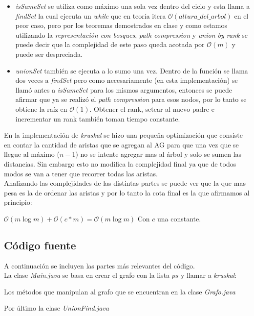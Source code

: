\begin{itemize}
	\item \textit{isSameSet} se utiliza como máximo una sola vez dentro del ciclo y esta llama a \textit{findSet} la cual ejecuta un \emph{while} que en teoría itera $\mathcal{O}(altura\_del\_arbol)$ en el peor caso, pero por los teoremas demostrados en clase y como estamos utilizando la \emph{representación con bosques}, \emph{path compression} y \emph{union by rank} se puede decir que la complejidad de este paso queda acotada por $\mathcal{O}(m)$ y puede ser despreciada.
	\item \textit{unionSet} también se ejecuta a lo sumo una vez. Dentro de la función se llama dos veces a \textit{findSet} pero como necesariamente (en esta implementación) se llamó antes a \textit{isSameSet} para los mismos argumentos, entonces se puede afirmar que ya se realizó el \emph{path compression} para esos nodos, por lo tanto se obtiene la raíz en $\mathcal{O}(1)$. Obtener el rank, setear al nuevo padre e incrementar un rank también toman tiempo constante.  
\end{itemize}

En la implementación de \textit{kruskal} se hizo una pequeña optimización que consiste en contar la cantidad de aristas que se agregan al AG para que una vez que se llegue al máximo ($n-1$) no se intente agregar mas al árbol y solo se sumen las distancias. Sin embargo esto no modifica la complejidad final ya que de todos modos se van a tener que recorrer todas las aristas.\\

Analizando las complejidades de las distintas partes se puede ver que la que mas pesa es la de ordenar las aristas y por lo tanto la cota final es la que afirmamos al principio:

\begin{center}
	$\mathcal{O}(m\log{}m) + \mathcal{O}(c*m) = \mathcal{O}(m\log{}m)$ Con $c$ una constante.
\end{center}

\subsection{Código fuente}

A continuación se incluyen las partes más relevantes del código.\\
La clase \emph{Main.java} se basa en crear el grafo con la lista $ps$ y llamar a \textit{kruskal}:

Los métodos que manipulan al grafo que se encuentran en la clase \emph{Grafo.java}

\newpage
Por último la clase \emph{UnionFind.java}



